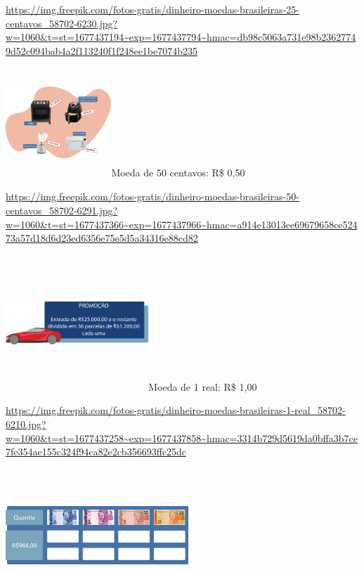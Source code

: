 \begin{multicols}{2}
{\url{https://img.freepik.com/fotos-gratis/dinheiro-moedas-brasileiras-25-centavos_58702-6230.jpg?w=1060\&t=st=1677437194~exp=1677437794~hmac=db98c5063a731e98b23627749d52c094bab4a2f113240f1f248ee1be7074b235}

\includegraphics[width=1.56667in,height=1.61849in]{media/image67.png}Moeda
de 50 centavos: R\$ 0,50

\url{https://img.freepik.com/fotos-gratis/dinheiro-moedas-brasileiras-50-centavos_58702-6291.jpg?w=1060\&t=st=1677437366~exp=1677437966~hmac=a914e13013ee69679658ce52473a57d18d6d23ed6356e75e5d5a34316e88cd82}

\includegraphics[width=2.11667in,height=2.01180in]{media/image68.png}Moeda
de 1 real: R\$ 1,00

\url{https://img.freepik.com/fotos-gratis/dinheiro-moedas-brasileiras-1-real_58702-6210.jpg?w=1060\&t=st=1677437258~exp=1677437858~hmac=3314b729d5619da0bffa3b7ce7fe354ae155c324f94ca82e2cb356693ffc25dc}

\includegraphics[width=2.71068in,height=1.97500in]{media/image69.png}%

}
\end{multicols}
